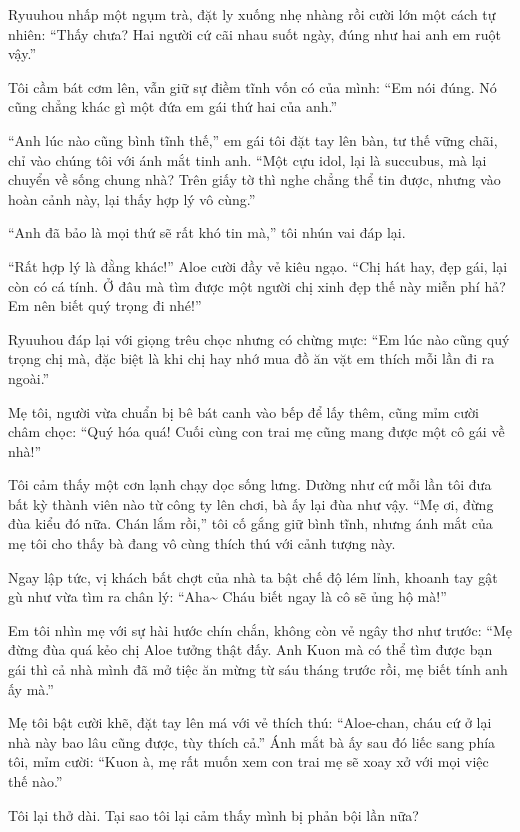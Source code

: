 \documentclass[../main.tex]{subfiles}
\begin{document}
Ryuuhou nhấp một ngụm trà, đặt ly xuống nhẹ nhàng rồi cười lớn một cách tự nhiên: ``Thấy chưa? Hai người cứ cãi nhau suốt ngày, đúng như hai anh em ruột vậy.''

Tôi cầm bát cơm lên, vẫn giữ sự điềm tĩnh vốn có của mình: ``Em nói đúng. Nó cũng chẳng khác gì một đứa em gái thứ hai của anh.''

``Anh lúc nào cũng bình tĩnh thế,'' em gái tôi đặt tay lên bàn, tư thế vững chãi, chỉ vào chúng tôi với ánh mắt tinh anh. ``Một cựu idol, lại là succubus, mà lại chuyển về sống chung nhà? Trên giấy tờ thì nghe chẳng thể tin được, nhưng vào hoàn cảnh này, lại thấy hợp lý vô cùng.''

``Anh đã bảo là mọi thứ sẽ rất khó tin mà,'' tôi nhún vai đáp lại.

``Rất hợp lý là đằng khác!'' Aloe cười đầy vẻ kiêu ngạo. ``Chị hát hay, đẹp gái, lại còn có cá tính. Ở đâu mà tìm được một người chị xinh đẹp thế này miễn phí hả? Em nên biết quý trọng đi nhé!''

Ryuuhou đáp lại với giọng trêu chọc nhưng có chừng mực: ``Em lúc nào cũng quý trọng chị mà, đặc biệt là khi chị hay nhớ mua đồ ăn vặt em thích mỗi lần đi ra ngoài.''

Mẹ tôi, người vừa chuẩn bị bê bát canh vào bếp để lấy thêm, cũng mỉm cười châm chọc: ``Quý hóa quá! Cuối cùng con trai mẹ cũng mang được một cô gái về nhà!''

Tôi cảm thấy một cơn lạnh chạy dọc sống lưng. Dường như cứ mỗi lần tôi đưa bất kỳ thành viên nào từ công ty lên chơi, bà ấy lại đùa như vậy. ``Mẹ ơi, đừng đùa kiểu đó nữa. Chán lắm rồi,'' tôi cố gắng giữ bình tĩnh, nhưng ánh mắt của mẹ tôi cho thấy bà đang vô cùng thích thú với cảnh tượng này.

Ngay lập tức, vị khách bất chợt của nhà ta bật chế độ lém lỉnh, khoanh tay gật gù như vừa tìm ra chân lý: ``Aha\~{} Cháu biết ngay là cô sẽ ủng hộ mà!''

Em tôi nhìn mẹ với sự hài hước chín chắn, không còn vẻ ngây thơ như trước: ``Mẹ đừng đùa quá kẻo chị Aloe tưởng thật đấy. Anh Kuon mà có thể tìm được bạn gái thì cả nhà mình đã mở tiệc ăn mừng từ sáu tháng trước rồi, mẹ biết tính anh ấy mà.''

Mẹ tôi bật cười khẽ, đặt tay lên má với vẻ thích thú: ``Aloe-chan, cháu cứ ở lại nhà này bao lâu cũng được, tùy thích cả.'' Ánh mắt bà ấy sau đó liếc sang phía tôi, mỉm cười: ``Kuon à, mẹ rất muốn xem con trai mẹ sẽ xoay xở với mọi việc thế nào.''

Tôi lại thở dài. Tại sao tôi lại cảm thấy mình bị phản bội lần nữa?
\end{document}
